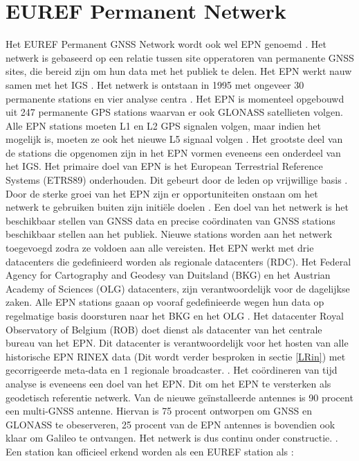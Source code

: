\section{EUREF Permanent Netwerk}
\label{LEPN}
Het EUREF Permanent GNSS Network wordt ook wel EPN genoemd \cite{LBibEPN3,LBibEPN2,LBibEPN}. Het netwerk is gebaseerd op een relatie tussen site opperatoren van permanente GNSS sites, die bereid zijn om hun data met het publiek te delen. Het EPN werkt nauw samen met het IGS \cite{LBibEPN3}. Het netwerk is ontstaan in 1995 met ongeveer 30 permanente stations en vier analyse centra \cite{LBibEPN5}. Het EPN is momenteel opgebouwd uit 247 permanente GPS stations waarvan er ook GLONASS satellieten volgen. Alle EPN stations moeten L1 en L2 GPS signalen volgen, maar indien het mogelijk is, moeten ze ook het nieuwe L5 signaal volgen \cite{LBibEPN4}. Het grootste deel van de stations die opgenomen zijn in het EPN vormen eveneens een onderdeel van het IGS. Het primaire doel van EPN is het European Terrestrial Reference Systems (ETRS89) onderhouden. Dit gebeurt door de leden op vrijwillige basis \cite{LBibEPN, LBibEPN2}. Door de sterke groei van het EPN zijn er opportuniteiten onstaan om het netwerk te gebruiken buiten zijn initi\"ele doelen \cite{LBibEPN5}. Een doel van het netwerk is het beschikbaar stellen van GNSS data en precise co\"ordinaten van GNSS stations beschikbaar stellen aan het publiek. Nieuwe stations worden aan het netwerk toegevoegd zodra ze voldoen aan alle vereisten. Het EPN werkt met drie datacenters die gedefinieerd worden als regionale datacenters (RDC). Het Federal Agency for Cartography and Geodesy van Duitsland (BKG) en het Austrian Academy of Sciences (OLG)  datacenters, zijn verantwoordelijk voor de dagelijkse zaken. Alle EPN stations gaaan op vooraf gedefinieerde wegen hun data op regelmatige basis doorsturen naar het BKG en het OLG \cite{LBibEPN2}. Het datacenter Royal Observatory of Belgium (ROB) doet dienst als datacenter van het centrale bureau van het EPN. Dit datacenter is verantwoordelijk voor het hosten van alle historische EPN RINEX data (Dit wordt verder besproken in sectie \ref{LRin}) met gecorrigeerde meta-data en 1 regionale broadcaster. \cite{LBibEPN2,LBibEPN3}. Het co\"ordineren van tijd analyse is eveneens een doel van het EPN. Dit om het EPN te versterken als geodetisch referentie netwerk. Van de nieuwe ge\"installeerde antennes is 90 procent een multi-GNSS antenne. Hiervan is 75 procent ontworpen om GNSS en GLONASS te obeserveren, 25 procent van de EPN antennes is bovendien ook klaar om Galileo te ontvangen. Het netwerk is dus continu onder constructie. \cite{LBibEPN3}. Een station kan officieel erkend worden als een EUREF station als \cite{LBibGNSS8}:
